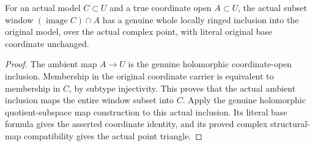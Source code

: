\begin{theorem}
\label{hir:actual-coordinate-window-inclusion}
\leanok
For an actual model $C\subset U$ and a true coordinate open $A\subset U$,
the actual subset window $(\operatorname{image}C)\cap A$ has a genuine
whole locally ringed inclusion into the original model, over the actual
complex point, with literal original base coordinate unchanged.
\end{theorem}
\begin{proof}
The ambient map $A\to U$ is the genuine holomorphic coordinate-open
inclusion. Membership in the original coordinate carrier is equivalent to
membership in $C$, by subtype injectivity. This proves that the actual
ambient inclusion maps the entire window subset into $C$. Apply the genuine
holomorphic quotient-subspace map construction to this actual inclusion.
Its literal base formula gives the asserted coordinate identity, and its
proved complex structural-map compatibility gives the actual point triangle.
\end{proof}

